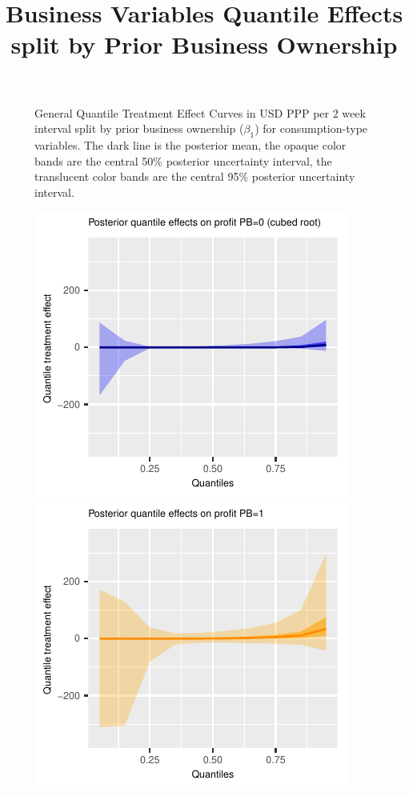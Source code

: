 \documentclass[AER]{AEA}
\begin{document}
\begin{figure}[h!]
  \caption{ General Quantile Treatment Effect Curves in USD PPP per 2 week interval split by prior business ownership ($\beta_1$) for consumption-type variables. The dark line is the posterior mean, the opaque color bands are the central 50\% posterior uncertainty interval, the translucent color bands are the central 95\% posterior uncertainty interval. } \label{consumption posterior general quantiles pb split}
\end{figure}



 \begin{figure}[h!]
  \centering
    \title{Business Variables Quantile Effects split by Prior Business Ownership}
    \includegraphics{posterior_parent_quantile_TEs_profit_pb_0_lognormal.pdf}
    \includegraphics{posterior_parent_quantile_TEs_profit_pb_1_lognormal.pdf}\\

\end{figure}
\end{document}
